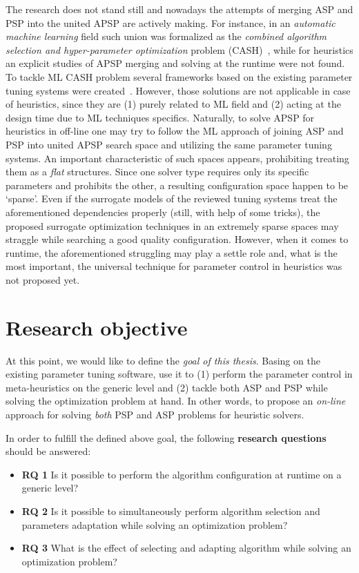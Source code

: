 The research does not stand still and nowadays the attempts of merging ASP and PSP into the united APSP are actively making. For instance, in an \emph{automatic machine learning} field such union was formalized as the \emph{combined algorithm selection and hyper-parameter optimization} problem (CASH)~\cite{thornton2013auto}, while for heuristics an explicit studies of APSP merging and solving at the runtime were not found. To tackle ML CASH problem several frameworks based on the existing parameter tuning systems were created~\cite{thornton2013auto,feurer2015efficient,olson2019tpot}. However, those solutions are not applicable in case of heuristics, since they are (1) purely related to ML field and (2) acting at the design time due to ML techniques specifics. Naturally, to solve APSP for heuristics in off-line one may try to follow the ML approach of joining ASP and PSP into united APSP search space and utilizing the same parameter tuning systems. An important characteristic of such spaces appears, prohibiting treating them as a \emph{flat} structures. Since one solver type requires only its specific parameters and prohibits the other, a resulting configuration space happen to be `sparse'. Even if the surrogate models of the reviewed tuning systems treat the aforementioned dependencies properly (still, with help of some tricks), the proposed surrogate optimization techniques in an extremely sparse spaces may straggle while searching a good quality configuration. However, when it comes to runtime, the aforementioned struggling may play a settle role and, what is the most important, the universal technique for parameter control in heuristics was not proposed yet.

\section{Research objective}\label{intro: research objective}
At this point, we would like to define the \emph{goal of this thesis}. Basing on the existing parameter tuning software, use it to (1) perform the parameter control in meta-heuristics on the generic level and (2) tackle both ASP and PSP while solving the optimization problem at hand. In other words, to propose an \emph{on-line} approach for solving \emph{both} PSP and ASP problems for heuristic solvers.

In order to fulfill the defined above goal, the following \textbf{research questions} should be answered:
\begin{itemize}
	\item \textbf{RQ 1} Is it possible to perform the algorithm configuration at runtime on a generic level?
	
	\item \textbf{RQ 2} Is it possible to simultaneously perform algorithm selection and parameters adaptation while solving an optimization problem?
	
	\item \textbf{RQ 3} What is the effect of selecting and adapting algorithm while solving an optimization problem?
\end{itemize}


